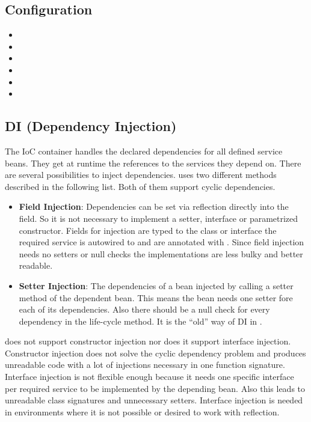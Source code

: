 \subsection{Configuration}
\begin{itemize}
	\item {}
	\item {}
	\item {}
	\item {}
	\item {}
	\item {}
\end{itemize}

\subsection{DI (Dependency Injection)}

The IoC container handles the declared dependencies for all defined service beans. They get at runtime the references to the services they depend on. There are several possibilities to inject dependencies. \AMBETH{} uses two different methods described in the following list. Both of them support cyclic dependencies.

\begin{itemize}
	\item \textbf{Field Injection}: Dependencies can be set via reflection directly into the field. So it is not necessary to implement a setter, interface or parametrized constructor. Fields for injection are typed to the class or interface the required service is autowired to and are annotated with . Since field injection needs no setters or null checks the implementations are less bulky and better readable.
	\item \textbf{Setter Injection}: The dependencies of a bean injected by calling a setter method of the dependent bean. This means the bean needs one setter fore each of its dependencies. Also there should be a null check for every dependency in the  life-cycle method. It is the ``old'' way of DI in \AMBETH.
\end{itemize}	

\AMBETH{} does not support constructor injection nor does it support interface injection. Constructor injection does not solve the cyclic dependency problem and produces unreadable code with a lot of injections necessary in one function signature. Interface injection is not flexible enough because it needs one specific interface per required service to be implemented by the depending bean. Also this leads to unreadable class signatures and unnecessary setters. Interface injection is needed in environments where it is not possible or desired to work with reflection.

